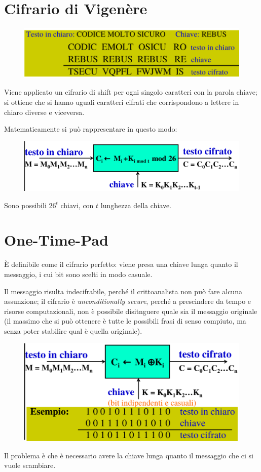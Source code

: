 \section{Cifrario di Vigenère}

\begin{figure}[H]
    \centering
    \includegraphics[width=0.8\linewidth]{chapters/chap02/images/vigenere.png}
\end{figure}

\noindent Viene applicato un cifrario di shift per ogni singolo 
caratteri con la parola chiave; si ottiene che si hanno uguali caratteri 
cifrati che corrispondono a lettere in chiaro diverse e viceversa.

\noindent Matematicamente si può rappresentare in questo modo:

\begin{figure}[H]
    \centering
    \includegraphics[width=0.8\linewidth]{chapters/chap02/images/vigenere2.png}
\end{figure}

\noindent Sono possibili $26^t$ chiavi, con $t$ lunghezza della chiave.

\section{One-Time-Pad}

È definibile come il cifrario perfetto: viene presa una chiave lunga 
quanto il messaggio, i cui bit sono scelti in modo casuale.

\noindent Il messaggio risulta indecifrabile, perché il crittoanalista non può fare 
alcuna assunzione; il cifrario è \textit{unconditionally secure}, perché a prescindere 
da tempo e risorse computazionali, non è possibile disitnguere quale sia il messaggio 
originale (il massimo che si può ottenere è tutte le possibili frasi di senso compiuto, ma 
senza poter stabilire qual è quella originale).

\begin{figure}[H]
    \centering
    \includegraphics[width=0.8\linewidth]{chapters/chap02/images/otp.png}
\end{figure}

\noindent Il problema è che è necessario avere la chiave lunga quanto il messaggio che ci 
si vuole scambiare.


